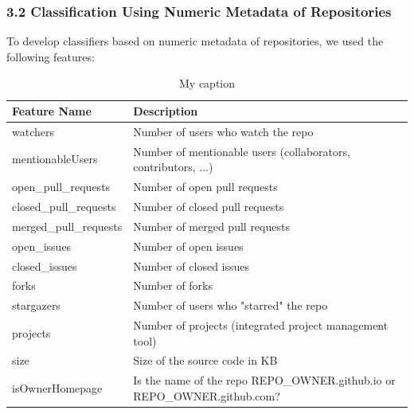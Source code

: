 \documentclass{article}
\begin{document}
\subsubsection{3.2 Classification Using Numeric Metadata of
Repositories}\label{classification-using-numeric-metadata-of-repositories}

To develop classifiers based on numeric metadata of repositories, we
used the following features:

\begin{table}[]
\centering
\caption{My caption}
\label{my-label}
\begin{tabularx}{\linewidth}{|l|X|}
\hline
Feature Name           & Description                                                                        \\ \hline
watchers               & Number of users who watch the repo                                                 \\ \hline
mentionableUsers       & Number of mentionable users (collaborators, contributors, ...)                     \\ \hline
open\_pull\_requests   & Number of open pull requests                                                       \\ \hline
closed\_pull\_requests & Number of closed pull requests                                                     \\ \hline
merged\_pull\_requests & Number of merged pull requests                                                     \\ \hline
open\_issues           & Number of open issues                                                              \\ \hline
closed\_issues         & Number of closed issues                                                            \\ \hline
forks                  & Number of forks                                                                    \\ \hline
stargazers             & Number of users who "starred" the repo                                             \\ \hline
projects               & Number of projects (integrated project management tool)                            \\ \hline
size                   & Size of the source code in KB                                                      \\ \hline
isOwnerHomepage        & Is the name of the repo REPO\_OWNER.github.io or REPO\_OWNER.github.com?         \\ \hline

\end{tabularx}
\end{table}
\end{document}
